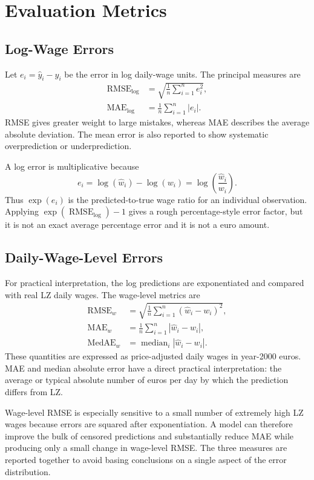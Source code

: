 \documentclass[12pt,a4paper,oneside,titlepage]{book}
\DeclareMathOperator{\RMSE}{RMSE}
\DeclareMathOperator{\MAE}{MAE}
\begin{document}
\section{Evaluation Metrics}
\label{sec:metrics}

\subsection{Log-Wage Errors}
Let $e_i=\widehat y_i-y_i$ be the error in log daily-wage units. The principal measures are
\begin{align}
  \RMSE_{\log} &= \sqrt{\frac{1}{n}\sum_{i=1}^{n}e_i^2},\\
  \MAE_{\log} &= \frac{1}{n}\sum_{i=1}^{n}|e_i|.
\end{align}
RMSE gives greater weight to large mistakes, whereas MAE describes the average absolute deviation. The mean error is also reported to show systematic overprediction or underprediction.

A log error is multiplicative because
\begin{equation}
  e_i=\log(\widehat w_i)-\log(w_i)
      =\log\!\left(\frac{\widehat w_i}{w_i}\right).
\end{equation}
Thus $\exp(e_i)$ is the predicted-to-true wage ratio for an individual observation. Applying $\exp(\RMSE_{\log})-1$ gives a rough percentage-style error factor, but it is not an exact average percentage error and it is not a euro amount.

\subsection{Daily-Wage-Level Errors}
For practical interpretation, the log predictions are exponentiated and compared with real LZ daily wages. The wage-level metrics are
\begin{align}
  \RMSE_{w} &= \sqrt{\frac{1}{n}\sum_{i=1}^{n}(\widehat w_i-w_i)^2},\\
  \MAE_{w} &= \frac{1}{n}\sum_{i=1}^{n}|\widehat w_i-w_i|,\\
  \operatorname{MedAE}_{w} &= \operatorname{median}_{i}|\widehat w_i-w_i|.
\end{align}
These quantities are expressed as price-adjusted daily wages in year-2000 euros. MAE and median absolute error have a direct practical interpretation: the average or typical absolute number of euros per day by which the prediction differs from LZ.

Wage-level RMSE is especially sensitive to a small number of extremely high LZ wages because errors are squared after exponentiation. A model can therefore improve the bulk of censored predictions and substantially reduce MAE while producing only a small change in wage-level RMSE. The three measures are reported together to avoid basing conclusions on a single aspect of the error distribution.
\end{document}
